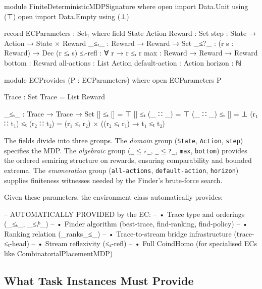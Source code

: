 \documentclass[9pt,a4paper]{article}
\theoremstyle{plain}
\theoremstyle{definition}
\theoremstyle{remark}
\begin{document}
\begin{code}[hide]
module FiniteDeterministicMDPSignature where
  open import Data.Unit using (⊤)
  open import Data.Empty using (⊥)
\end{code}

\begin{code}
  record ECParameters : Set₁ where
    field
      State Action Reward : Set
      step      : State → Action → State × Reward
      _≤ᵣ_      : Reward → Reward → Set
      _≤?_      : (r s : Reward) → Dec (r ≤ᵣ s)
      ≤ᵣ-refl   : ∀ {r} → r ≤ᵣ r
      max       : Reward → Reward → Reward
      bottom    : Reward
      all-actions    : List Action
      default-action : Action
      horizon   : ℕ
\end{code}

\begin{code}[hide]
  module ECProvides (P : ECParameters) where
    open ECParameters P
    
    Trace : Set
    Trace = List Reward
    
    _≤ₜ_ : Trace → Trace → Set
    []       ≤ₜ []       = ⊤
    []       ≤ₜ (_ ∷ _)  = ⊤
    (_ ∷ _)  ≤ₜ []       = ⊥
    (r₁ ∷ t₁) ≤ₜ (r₂ ∷ t₂) = (r₁ ≤ᵣ r₂) × ((r₂ ≤ᵣ r₁) → t₁ ≤ₜ t₂)
\end{code}

\noindent The fields divide into three groups.  The \emph{domain} group (\texttt{State}, \texttt{Action}, \texttt{step}) specifies the MDP.  The \emph{algebraic} group (\texttt{\_$\le$ᵣ\_}, \texttt{\_$\le$?\_}, \texttt{max}, \texttt{bottom}) provides the ordered semiring structure on rewards, ensuring comparability and bounded extrema.  The \emph{enumeration} group (\texttt{all-actions}, \texttt{default-action}, \texttt{horizon}) supplies finiteness witnesses needed by the Finder's brute-force search.

Given these parameters, the environment class automatically provides:

\begin{code}
  -- AUTOMATICALLY PROVIDED by the EC:
  -- • Trace type and orderings (_≤ₜ_, _≤ₜᵇ_)
  -- • Finder algorithm (best-trace, find-ranking, find-policy)
  -- • Ranking relation (_ranks_≤_)
  -- • Trace-to-stream bridge infrastructure (trace-≤ₜ-head)
  -- • Stream reflexivity (≤ₛ-refl)
  -- • Full CoindHomo (for specialised ECs like CombinatorialPlacementMDP)
\end{code}

\subsection{What Task Instances Must Provide}\label{sec:task-provide}
\end{document}
